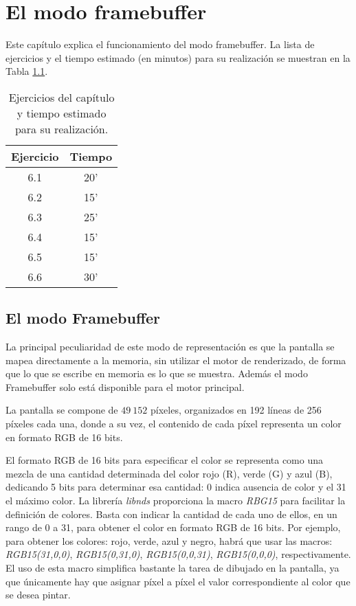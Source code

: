 \chapter{El modo framebuffer}

Este capítulo explica el funcionamiento del modo framebuffer. La lista de ejercicios y el tiempo estimado (en minutos) para su realización se muestran en la Tabla \ref{c6_tab:ejercios}.

\begin{table}[t]
	\centering
	\caption{Ejercicios del capítulo y tiempo estimado para su realización.}
	\begin{tabular}{|c|c|}
		\hline 
		Ejercicio & Tiempo \\ 
		\hline 
		6.1 & 20' \\ 
		6.2 & 15' \\ 
		6.3 & 25' \\ 
		6.4 & 15' \\ 
		6.5 & 15' \\ 
		6.6 & 30' \\ 
		\hline 
	\end{tabular} 
	\label{c6_tab:ejercios}
\end{table}

\section{El modo Framebuffer}
La principal peculiaridad de este modo de representación es que la pantalla se mapea directamente a la memoria, sin utilizar el motor de renderizado, de forma que lo que se escribe en memoria es lo que se muestra. Además el modo Framebuffer solo está disponible para el motor principal. 

La pantalla se compone de $49\ 152$ píxeles, organizados en 192 líneas de 256 píxeles cada una, donde a su vez, el contenido de cada píxel representa un color en formato RGB de 16 bits.

El formato RGB de 16 bits para especificar el color se representa como una mezcla de una cantidad determinada del color rojo (R), verde (G) y azul (B), dedicando 5 bits para determinar esa cantidad: 0 indica ausencia de color y el 31 el máximo color. La librería \textit{libnds} proporciona la macro \textit{RBG15} para facilitar la definición de colores. Basta con indicar la cantidad de cada uno de ellos, en un rango de 0 a 31, para obtener el color en formato RGB de 16 bits. Por ejemplo, para obtener los colores: rojo, verde, azul y negro, habrá que usar las macros: \textit{RGB15(31,0,0)}, \textit{RGB15(0,31,0)}, \textit{RGB15(0,0,31)}, \textit{RGB15(0,0,0)}, respectivamente. El uso de esta macro simplifica bastante la tarea de dibujado en la pantalla, ya que únicamente hay que asignar píxel a píxel el valor correspondiente al color que
se desea pintar.

